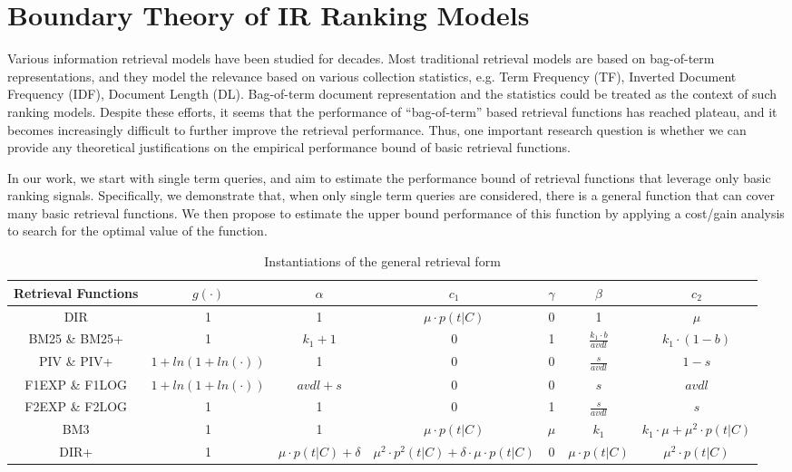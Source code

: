 \chapter{Boundary Theory of IR Ranking Models}

Various information retrieval models have been studied for decades. 
Most traditional retrieval models are based on bag-of-term 
representations, and they model the relevance based on various 
collection statistics, e.g. Term Frequency (TF), 
Inverted Document Frequency (IDF), Document Length (DL). 
Bag-of-term document representation and the statistics could be 
treated as the context of such ranking models.
Despite these efforts, it seems that the performance of 
``bag-of-term'' based retrieval functions has reached plateau, 
and it becomes increasingly difficult to further improve the retrieval 
performance. Thus, one important research question is whether 
we can provide any theoretical justifications on the empirical 
performance bound of basic retrieval functions. 

In our work, we start with single term queries, and aim to
estimate the performance bound of retrieval functions that
leverage only basic ranking signals. Specifically, we demonstrate that, 
when only single term queries are considered, there is a general 
function that can cover many basic retrieval functions. We then
propose to estimate the upper bound performance of this
function by applying a cost/gain analysis to search for the
optimal value of the function.


\begin{table*}[t]
\tiny
\centering
\caption{Instantiations of the general retrieval form}
\label{tab:allmodels}
\begin{tabular}{ ccccccc } \hline
Retrieval Functions & $g(\cdot)$ & $\alpha$ & $c_1$ & $\gamma$ & $\beta$ & $c_2$ \\\hline \hline
DIR & 1 & 1 & $\mu\cdot p(t|C)$ & 0 & 1 & $\mu$ \\ \hline
BM25 \& BM25+ & 1 & $k_1+1$ & 0 & 1 & $\frac{k_1 \cdot b}{avdl}$ & $k_1 \cdot (1-b)$ \\ \hline
PIV \& PIV+ & $1+ln(1+ln(\cdot))$ & 1 & 0 & 0 & $\frac{s}{avdl}$ & $1-s$ \\ \hline
F1EXP \& F1LOG & $1+ln(1+ln(\cdot))$ & $avdl+s$ & 0 & 0 & $s$ & $avdl$ \\ \hline
F2EXP \& F2LOG & 1 & 1 & 0 & 1 & $\frac{s}{avdl}$ & $s$ \\ \hline
BM3 & 1 & 1 & $\mu \cdot p(t|C)$ & $\mu$ & $k_1$ & $k_1\cdot \mu + \mu^2 \cdot p(t|C)$ \\ \hline
DIR+ & 1 & $\mu \cdot p(t|C)+\delta$ & $\mu^2\cdot p^2(t|C)+\delta \cdot \mu \cdot p(t|C)$ & 0 & $\mu \cdot p(t|C)$ & $\mu^2 \cdot p(t|C)$ \\ \hline 
\hline
\end{tabular}
\end{table*}


